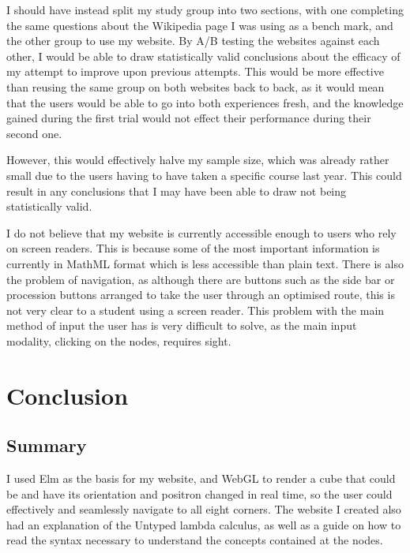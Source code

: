\documentclass{l4proj}
\begin{document}
I should have instead split my study group into two sections, with one completing the same questions about the Wikipedia page I was using as a bench mark, and the other group to use my website.  By A/B testing the websites against each other, I would be able to draw statistically valid conclusions about the efficacy of my attempt to improve upon previous attempts.  This would be more effective than reusing the same group on both websites back to back, as it would mean that the users would be able to go into both experiences fresh, and the knowledge gained during the first trial would not effect their performance during their second one. 

However, this would effectively halve my sample size, which was already rather small due to the users having to have taken a specific course last year. This could result in any conclusions that I may have been able to draw not being statistically valid.

I do not believe that my website is currently accessible enough to users who rely on screen readers.  This is because some of the most important information is currently in MathML format which is less accessible than plain text.  There is also the problem of navigation, as although there are buttons such as the side bar or procession buttons arranged to take the user through an optimised route, this is not very clear to a student using a screen reader.  This problem with the main method of input the user has is very difficult to solve, as the main input modality, clicking on the nodes, requires sight.

\chapter{Conclusion}    

\section{Summary}

I used Elm as the basis for my website, and WebGL to render a cube that could be and have its orientation and positron changed in real time, so the user could effectively and seamlessly navigate to all eight corners. The website I created also had an explanation of the Untyped lambda calculus, as well as a guide on how to read the syntax necessary to understand the concepts contained at the nodes.
\end{document}
